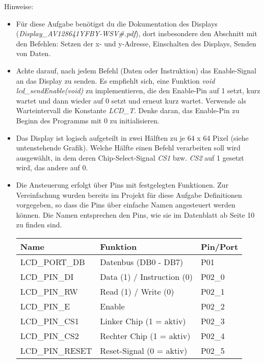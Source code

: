 Hinweise:
\begin{itemize}
\item
Für diese Aufgabe benötigst du die Dokumentation des Displays (\textit{Display\_AV128641YFBY-WSV\#.pdf}), dort insbesondere den Abschnitt mit den Befehlen: Setzen der x- und y-Adresse, Einschalten des Displays, Senden von Daten.

\item
Achte darauf, nach jedem Befehl (Daten oder Instruktion) das Enable-Signal an das Display zu senden.
Es empfiehlt sich, eine Funktion \textit{void lcd\_sendEnable(void)} zu implementieren, die den Enable-Pin auf 1 setzt, kurz wartet und dann wieder auf 0 setzt und erneut kurz wartet.
Verwende als Warteintervall die Konstante \emph{LCD\_T}.
Denke daran, das Enable-Pin zu Beginn des Programms mit 0 zu initialisieren.

\item
Das Display ist logisch aufgeteilt in zwei Hälften zu je 64 x 64 Pixel (siehe untenstehende Grafik).
Welche Hälfte einen Befehl verarbeiten soll wird ausgewählt, in dem deren Chip-Select-Signal \emph{CS1} bzw. \emph{CS2} auf 1 gesetzt wird, das andere auf 0.

\item
Die Ansteuerung erfolgt über Pins mit festgelegten Funktionen. Zur Vereinfachung wurden bereits im Projekt für diese Aufgabe Definitionen vorgegeben, so dass die Pins über einfache Namen angesteuert werden können. Die Namen entsprechen den Pins, wie sie im Datenblatt ab Seite 10 zu finden sind.

\begin{center}
\begin{tabular}{l|l|l}
	\toprule
\textbf{Name} & \textbf{Funktion} & \textbf{Pin/Port} \\ 
 \midrule
LCD\_PORT\_DB & Datenbus (DB0 - DB7) & P01 \\ 
LCD\_PIN\_DI & Data (1) / Instruction (0) & P02\_0 \\ 
LCD\_PIN\_RW & Read (1) / Write (0) & P02\_1 \\ 
LCD\_PIN\_E & Enable & P02\_2 \\ 
LCD\_PIN\_CS1 & Linker Chip (1 = aktiv) & P02\_3 \\ 
LCD\_PIN\_CS2 & Rechter Chip (1 = aktiv) & P02\_4 \\ 
LCD\_PIN\_RESET & Reset-Signal (0 = aktiv) & P02\_5 \\ 
\bottomrule
\end{tabular}
\end{center}


\end{itemize}
